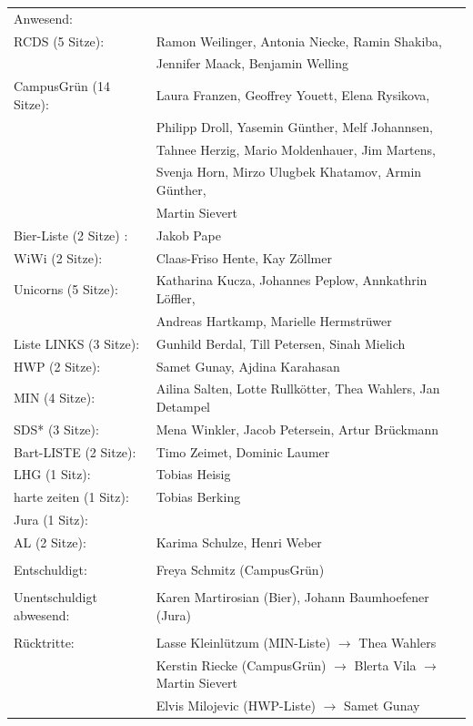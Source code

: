 \documentclass[ngerman,headheight=70pt]{scrartcl}
\begin{document}
    \begin{tabular}{ll}
        Anwesend: & \\
            RCDS (5 Sitze): & Ramon Weilinger, Antonia Niecke, Ramin Shakiba, \\
                            & Jennifer Maack, Benjamin Welling \\
             CampusGrün (14 Sitze): & Laura Franzen, Geoffrey Youett, Elena Rysikova, \\
                                   & Philipp Droll, Yasemin Günther, Melf Johannsen,\\
                                   & Tahnee Herzig, Mario Moldenhauer, Jim Martens,\\
                                   & Svenja Horn, Mirzo Ulugbek Khatamov, Armin Günther,\\
                                   & Martin Sievert \\
             Bier-Liste (2 Sitze) : & Jakob Pape \\
             WiWi (2 Sitze): & Claas-Friso Hente, Kay Zöllmer \\
             Unicorns (5 Sitze): & Katharina Kucza, Johannes Peplow, Annkathrin Löffler, \\
                                 & Andreas Hartkamp, Marielle Hermstrüwer \\
             Liste LINKS (3 Sitze): & Gunhild Berdal, Till Petersen, Sinah Mielich \\
             HWP (2 Sitze): & Samet Gunay, Ajdina Karahasan \\
             MIN (4 Sitze): & Ailina Salten, Lotte Rullkötter, Thea Wahlers, Jan Detampel \\
             SDS* (3 Sitze): & Mena Winkler, Jacob Petersein, Artur Brückmann \\
             Bart-LISTE (2 Sitze): & Timo Zeimet, Dominic Laumer \\
             LHG (1 Sitz): & Tobias Heisig \\
             harte zeiten (1 Sitz): & Tobias Berking \\
             Jura (1 Sitz): & \\
             AL (2 Sitze): & Karima Schulze, Henri Weber \\
            & \\
        Entschuldigt: & Freya Schmitz (CampusGrün)\\
                                &\\
        Unentschuldigt abwesend: & Karen Martirosian (Bier), Johann Baumhoefener (Jura) \\
                                &\\
        Rücktritte: & Lasse Kleinlützum (MIN-Liste) \(\rightarrow\) Thea Wahlers \\
                    & Kerstin Riecke (CampusGrün) \(\rightarrow\) Blerta Vila \(\rightarrow\) Martin Sievert\\
                    & Elvis Milojevic (HWP-Liste) \(\rightarrow\) Samet Gunay
    \end{tabular}
\end{document}
